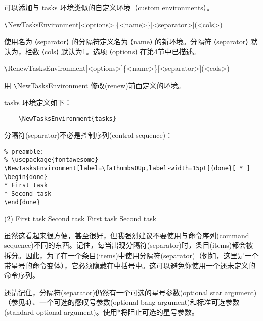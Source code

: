 \documentclass[a4paper,12pt,indent]{article}
\begin{document}
可以添加与 tasks 环境类似的自定义环境（custom environments）。

\verb|\|\textcolor{Tasks}{NewTasksEnvironment[<options>]\{<name>\}[<separator>](<cols>)}

使用名为 ⟨separator⟩ 的分隔符定义名为 ⟨name⟩ 的新环境。分隔符 ⟨separator⟩ 默认为\task，栏数 ⟨cols⟩ 默认为1。选项 ⟨options⟩ 在第4节中已描述。

\verb|\|\textcolor{Tasks}{RenewTasksEnvironment[<options>]\{<name>\}[<separator>](<cols>)}

用 \verb|\|\textcolor{Tasks}{NewTasksEnvironment} 修改(renew)前面定义的环境。

tasks 环境定义如下：

\begin{tcolorbox}[collower=black,colframe=Tasks,colback=white]
    \begin{lstlisting}
    \NewTasksEnvironment{tasks}
    \end{lstlisting}
\end{tcolorbox}

分隔符(separator)不必是控制序列(control sequence)：

\begin{tcolorbox}[collower=black,colframe=Tasks,colback=white]
    \begin{lstlisting}
% preamble:
% \usepackage{fontawesome}
\NewTasksEnvironment[label=\faThumbsOUp,label-width=15pt]{done}[ * ]
\begin{done}
* First task
* Second task
\end{done}
\end{lstlisting}
        \tcblower
\begin{tasks}(2)
\task[$\clubsuit$] First task
\task[$\spadesuit $] Second task
\task[$\surd $] First task
\task[$\heartsuit $] Second task
\end{tasks}
\end{tcolorbox}

虽然这看起来很方便，甚至很好，但我强烈建议不要使用与命令序列(command sequence)不同的东西。记住，每当出现分隔符(separator)时，条目(items)都会被拆分。因此，为了在一个条目(items)中使用分隔符(separator)（例如，这里是一个带星号的命令变体），它必须隐藏在中括号中。这可以避免你使用一个还未定义的命令序列。

还请记住，分隔符(separator)仍然有一个可选的星号参数(optional star argument)（参见4）、一个可选的感叹号参数(optional bang argument)和标准可选参数(standard optional argument)。使用*将阻止可选的星号参数。
\end{document}
